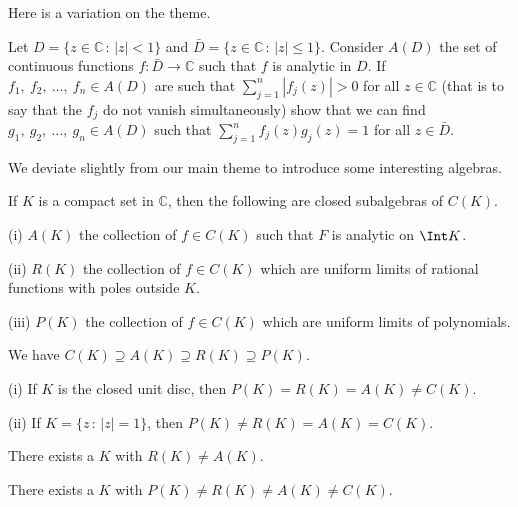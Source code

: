 Here is a variation on the theme.
\begin{lemma} Let $D=\{z\in{\mathbb C}\,:\,|z|<1\}$
and $\bar{D}=\{z\in{\mathbb C}\,:\,|z|\leq1\}$.
Consider $A(D)$ the set of continuous functions
$f:\bar{D}\rightarrow{\mathbb C}$ such that $f$
is analytic in $D$. If $f_{1},\ f_{2},\ \dots,\ f_{n}\in A(D)$
are such that $\sum_{j=1}^{n}|f_{j}(z)|>0$ for all $z\in{\mathbb C}$
(that is to say that the $f_{j}$ do not vanish simultaneously)
show that we can find $g_{1},\ g_{2},\ \dots,\ g_{n}\in A(D)$
such that $\sum_{j=1}^{n}f_{j}(z)g_{j}(z)=1$ for
all $z\in\bar{D}$.
\end{lemma}
We deviate slightly from our main theme to
introduce some interesting algebras.
\begin{added}[Lemma] If $K$ is a compact set in ${\mathbb C}$,
then the following are closed subalgebras of $C(K)$.

(i) $A(K)$ the collection of $f\in C(K)$ such that
$F$ is analytic on $\Int K$.

(ii) $R(K)$ the collection of $f\in C(K)$ which are
uniform limits of rational functions with poles outside $K$.

(iii) $P(K)$ the collection of $f\in C(K)$ which are
uniform limits of polynomials.

We have $C(K)\supseteq A(K)\supseteq R(K)\supseteq P(K)$.
\end{added}
\begin{added}[Exercise] (i) If $K$ is the closed unit disc, then
$P(K)=R(K)=A(K)\neq C(K)$.

(ii) If $K=\{z\,:\,|z|=1\}$, then
$P(K)\neq R(K)=A(K)=C(K)$.
\end{added}
\begin{added} There exists a $K$ with
$R(K)\neq A(K)$.
\end{added}
\begin{added}[Exercise] There exists a $K$ with
$P(K)\neq R(K)\neq A(K)\neq C(K)$.
\end{added}


